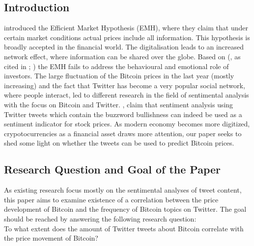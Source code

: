 \documentclass[a4paper,american,12pt]{article}
\begin{document}
\begin{spacing}{1.2}
\cleardoublepage{}
\section{Introduction}
\label{sec:intro}

\textcite[p.~388]{malkiel1970efficient} introduced the Efficient Market Hypothesis (EMH), where they claim that under certain market conditions actual prices include all information. This hypothesis is broadly accepted in the financial world. The digitalisation leads to an increased network effect, where information can be shared over the globe. Based on \citeauthor{mao2015quantifying} (\citeyear[][p.~3]{mao2015quantifying}, as cited in \cite[][pp.~175--195]{shiller2015irrational}; \cite[][pp.~279]{kahneman2013prospect}) the EMH fails to address the behavioural and emotional role of investors. The large fluctuation of the Bitcoin prices in the last year (mostly increasing) and the fact that Twitter has become a very popular social network, where people interact, led to different research in the field of sentimental analysis with the focus on Bitcoin and Twitter. \textcite[p.~18]{mao2015quantifying}, claim that sentiment analysis using Twitter tweets which contain the buzzword bullishness can indeed be used as a sentiment indicator for stock prices. As modern economy becomes more digitized, crypotocurrencies as a financial asset draws more attention, our paper seeks to shed some light on whether the tweets can be used to predict Bitcoin prices.

\subsection{Research Question and Goal of the Paper}
\label{sec:ResearchQandGoal}

As existing research focus mostly on the sentimental analyses of tweet content, this paper aims to examine existence of a correlation between the price development of Bitcoin and the frequency of Bitcoin topics on Twitter. The goal should be reached by answering the following research question: \\
To what extent does the amount of Twitter tweets about Bitcoin correlate with the price movement of Bitcoin?



\end{spacing}
\end{document}

